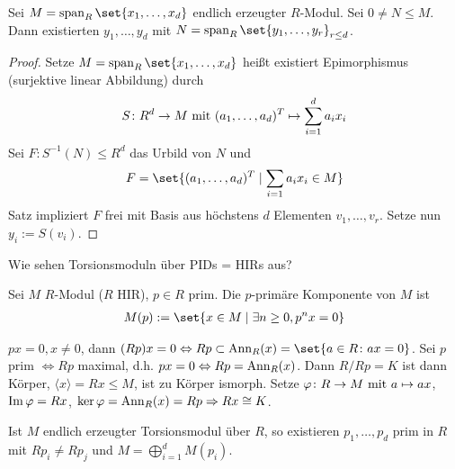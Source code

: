 \begin{conclusion}
	Sei $M = \Span_R\set{x_1, \dots, x_d}$ endlich erzeugter $R$-Modul. Sei $0 \neq N \le M$. Dann existierten $y_1, \dots, y_d$ mit $N = \Span_R\set{y_1, \dots, y_r}_{r \le d}$.
\end{conclusion}
\begin{proof}
	Setze $M = \Span_R\set{x_1, \dots, x_d}$ heißt existiert Epimorphismus (surjektive linear Abbildung) durch 
	\begin{align*}
		S\colon R^d \to M \mit (a_1, \dots, a_d)^T \mapsto \sum_{i=1}^d a_i x_i
	\end{align*}
	Sei $F\colon S^{-1}(N) \le R^d$ das Urbild von $N$ und
	\begin{align*}
		F = \set{(a_1, \dots, a_d)^T \mid \sum_{i=1}a_i x_i \in M}
	\end{align*}
	Satz impliziert $F$ frei mit Basis aus höchstens $d$ Elementen $v_1, \dots, v_r$. Setze nun $y_i := S(v_i)$.
\end{proof}
Wie sehen Torsionsmoduln über PIDs = HIRs aus?
\begin{definition}
	Sei $M$ $R$-Modul ($R$ HIR), $p \in R$ prim. Die $p$-primäre Komponente von $M$ ist
	\begin{align*}
		M(p) := \set{x \in M \mid \exists n \ge 0, p^n x = 0}
	\end{align*}
\end{definition}
\begin{remark}
	$px = 0, x \neq 0$, dann $(Rp)x = 0 \Leftrightarrow Rp \subset \Ann_R(x) = \set{a \in R \colon ax = 0}$. Sei $p$ prim $\Leftrightarrow Rp$ maximal, d.h. $px = 0 \Leftrightarrow Rp = \Ann_R(x)$. Dann $R/Rp = K$ ist dann Körper, $\langle x \rangle = Rx \le M$, ist zu Körper ismorph. Setze $\varphi\colon R \to M \mit a \mapsto ax$, $\Image \varphi = Rx$, $\ker \varphi = \Ann_R(x) = Rp \implies Rx \cong K$.
\end{remark}
\begin{proposition}
	Ist $M$ endlich erzeugter Torsionsmodul über $R$, so existieren $p_1, \dots, p_d$ prim in $R$ mit $Rp_i \neq Rp_j$ und $M = \bigoplus_{i=1}^d M(p_i)$.
\end{proposition}
